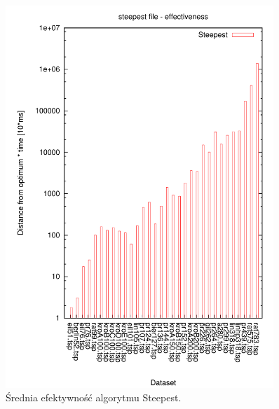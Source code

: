 \begin{figure}
\begin{center}
\includegraphics[width=0.9\textwidth]{wykresy/steepest_ef}
\end{center}
\caption{Średnia efektywność algorytmu Steepest.}
\label{steepest_ef}
\end{figure}


